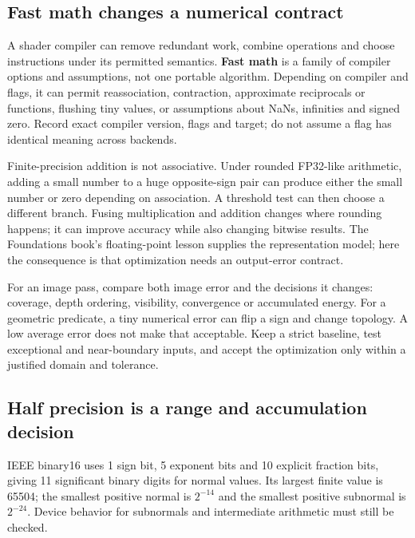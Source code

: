 \subsection{Fast math changes a numerical contract}\label{03-visual-computing-i-ch016-fast-math-changes-a-numerical-contract}

A shader compiler can remove redundant work, combine operations and choose instructions under its permitted semantics. \textbf{Fast math} is a family of compiler options and assumptions, not one portable algorithm. Depending on compiler and flags, it can permit reassociation, contraction, approximate reciprocals or functions, flushing tiny values, or assumptions about NaNs, infinities and signed zero. Record exact compiler version, flags and target; do not assume a flag has identical meaning across backends.

Finite-precision addition is not associative. Under rounded FP32-like arithmetic, adding a small number to a huge opposite-sign pair can produce either the small number or zero depending on association. A threshold test can then choose a different branch. Fusing multiplication and addition changes where rounding happens; it can improve accuracy while also changing bitwise results. The Foundations book's floating-point lesson supplies the representation model; here the consequence is that optimization needs an output-error contract.

For an image pass, compare both image error and the decisions it changes: coverage, depth ordering, visibility, convergence or accumulated energy. For a geometric predicate, a tiny numerical error can flip a sign and change topology. A low average error does not make that acceptable. Keep a strict baseline, test exceptional and near-boundary inputs, and accept the optimization only within a justified domain and tolerance.

\subsection{Half precision is a range and accumulation decision}\label{03-visual-computing-i-ch016-half-precision-is-a-range-and-accumulation-decision}

IEEE binary16 uses 1 sign bit, 5 exponent bits and 10 explicit fraction bits, giving 11 significant binary digits for normal values. Its largest finite value is 65504; the smallest positive normal is \(2^{-14}\) and the smallest positive subnormal is \(2^{-24}\). Device behavior for subnormals and intermediate arithmetic must still be checked.

